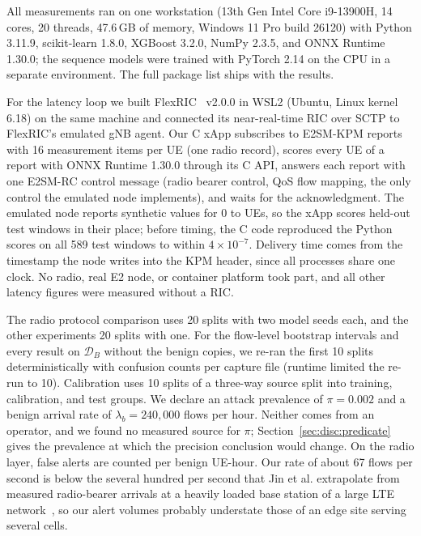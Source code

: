 \documentclass{ieeeaccess}
\newcommand{\DB}{\ensuremath{\mathcal{D}_{B}}}
\begin{document}
All measurements ran on one workstation (13th Gen Intel Core i9-13900H, 14 cores, 20 threads, 47.6\,GB of memory, Windows 11 Pro build 26120) with Python 3.11.9, scikit-learn 1.8.0, XGBoost 3.2.0, NumPy 2.3.5, and ONNX Runtime 1.30.0; the sequence models were trained with PyTorch 2.14 on the CPU in a separate environment. The full package list ships with the results.

For the latency loop we built FlexRIC~\cite{schmidt2021flexric} v2.0.0 in WSL2 (Ubuntu, Linux kernel 6.18) on the same machine and connected its near-real-time RIC over SCTP to FlexRIC's emulated gNB agent. Our C xApp subscribes to E2SM-KPM reports with 16 measurement items per UE (one radio record), scores every UE of a report with ONNX Runtime 1.30.0 through its C API, answers each report with one E2SM-RC control message (radio bearer control, QoS flow mapping, the only control the emulated node implements), and waits for the acknowledgment. The emulated node reports synthetic values for 0 to \RicUEsMax{} UEs, so the xApp scores held-out test windows in their place; before timing, the C code reproduced the Python scores on all 589 test windows to within $4\times10^{-7}$. Delivery time comes from the timestamp the node writes into the KPM header, since all processes share one clock. No radio, real E2 node, or container platform took part, and all other latency figures were measured without a RIC.

The radio protocol comparison uses 20 splits with two model seeds each, and the other experiments 20 splits with one. For the flow-level bootstrap intervals and every result on \DB{} without the benign copies, we re-ran the first 10 splits deterministically with confusion counts per capture file (runtime limited the re-run to 10). Calibration uses 10 splits of a three-way source split into training, calibration, and test groups. We declare an attack prevalence of $\pi = 0.002$ and a benign arrival rate of $\lambda_{b} = 240{,}000$ flows per hour. Neither comes from an operator, and we found no measured source for $\pi$; Section~\ref{sec:disc:predicate} gives the prevalence at which the precision conclusion would change. On the radio layer, false alerts are counted per benign UE-hour. Our rate of about 67 flows per second is below the several hundred per second that Jin et al. extrapolate from measured radio-bearer arrivals at a heavily loaded base station of a large LTE network~\cite{jin2013softcell}, so our alert volumes probably understate those of an edge site serving several cells.
\end{document}
